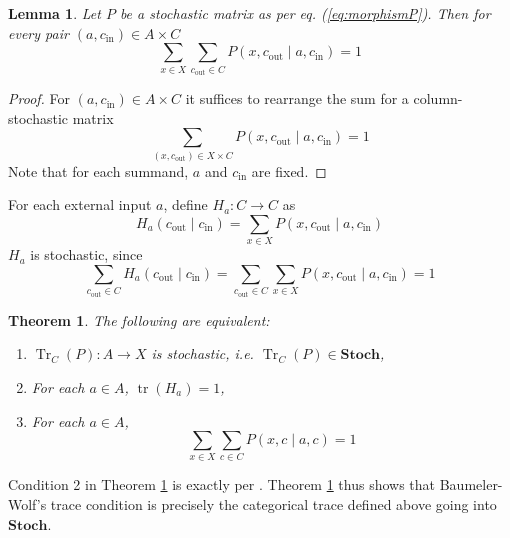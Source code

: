 \documentclass[10pt, a4paper]{article}
\newcommand{\Tr}[0]{\operatorname{Tr}}
\newcommand{\tr}[0]{\operatorname{tr}}
\newtheorem{theorem}{Theorem}
\newtheorem{lemma}{Lemma}
\begin{document}
\begin{lemma}\label{lemma:morphismP}
Let $P$ be a stochastic matrix as per eq. (\ref{eq:morphismP}). Then for every pair $(a, c_{\mathrm{in}}) \in A \times C$ $$ \sum_{x \in X}\sum_{c_{\mathrm{out}}\in C} P(x, c_{\mathrm{out}} \mid a, c_{\mathrm{in}}) = 1 $$ 
\end{lemma}

\begin{proof}
    For $(a, c_{\mathrm{in}})\in A \times C$ it suffices to rearrange the sum for a column-stochastic matrix $$ \sum_{(x,c_{\mathrm{out}}) \in X \times C} P(x, c_{\mathrm{out}} \mid a, c_{\mathrm{in}}) = 1 $$ Note that for each summand, $a$ and $c_{\mathrm{in}}$ are fixed.
\end{proof}

For each external input $a$, define  $H_a : C \rightarrow C $ as $$ H_a (c_{\mathrm{out}} \mid c_{\mathrm{in}}) = \sum_{x \in X} P(x, c_{\mathrm{out}} \mid a, c_{\mathrm{in}}) $$ $H_a$ is stochastic, since $$ \sum_{c_{\mathrm{out}} \in C} H_a(c_{\mathrm{out}} \mid c_{\mathrm{in}}) = \sum_{c_{\mathrm{out}}\in C}\sum_{x \in X} P(x, c_{\mathrm{out}} \mid a, c_{\mathrm{in}}) = 1 $$ 

\begin{theorem}\label{thm:stoch-is-Tr}
    The following are equivalent: 
    \begin{enumerate}
        \item $\Tr_C(P) : A \rightarrow X$ is stochastic, \emph{i.e.} $\Tr_C(P) \in \mathbf{Stoch}$,
        \item For each $a \in A$, $\tr(H_a) = 1$,
        \item For each $a \in A$, $$ \sum_{x \in X} \sum_{c \in C}P(x, c\mid a, c) = 1 $$
    \end{enumerate}
\end{theorem}

Condition 2 in Theorem \ref{thm:stoch-is-Tr} is exactly per \cite[eq. (2)]{BaumelerWolf2017}. Theorem \ref{thm:stoch-is-Tr} thus shows that Baumeler-Wolf's trace condition is precisely the categorical trace defined above going into $\mathbf{Stoch}$.
\end{document}
